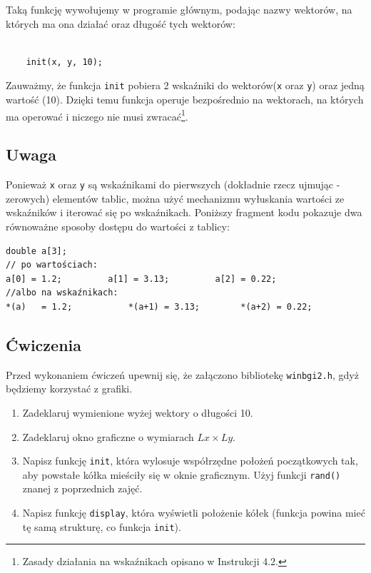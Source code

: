 \documentclass{instrukcja}
\begin{document}
Taką funkcję wywołujemy w programie głównym, podając nazwy wektorów, na których ma ona działać oraz długość tych wektorów:

\begin{verbatim}

	init(x, y, 10);

\end{verbatim}

Zauważmy, że funkcja {\tt init} pobiera 2 wskaźniki do wektorów({\tt x} oraz {\tt y}) oraz jedną wartość (10). Dzięki temu funkcja operuje bezpośrednio na wektorach, na których ma operować i niczego nie musi zwracać\footnote{Zasady działania na wskaźnikach opisano w Instrukcji 4.2.}. 

\subsection*{Uwaga}
Ponieważ {\tt x} oraz {\tt y} są wskaźnikami do pierwszych (dokładnie rzecz ujmując - zerowych) elementów tablic, można użyć mechanizmu wyłuskania wartości ze wskaźników i iterować się po wskaźnikach. Poniższy fragment kodu pokazuje dwa równoważne sposoby dostępu do wartości z tablicy:

\begin{verbatim}
double a[3];
// po wartościach:
a[0] = 1.2;         a[1] = 3.13;         a[2] = 0.22;
//albo na wskaźnikach:
*(a)   = 1.2;           *(a+1) = 3.13;        *(a+2) = 0.22;
\end{verbatim}

\subsection*{Ćwiczenia}
Przed wykonaniem ćwiczeń upewnij się, że załączono bibliotekę \verb|winbgi2.h|, gdyż będziemy korzystać z grafiki.
\begin{enumerate}
\item Zadeklaruj wymienione wyżej wektory o długości 10.
\item Zadeklaruj okno graficzne o wymiarach \(Lx \times Ly\).
\item Napisz funkcję \verb|init|, która wylosuje współrzędne położeń początkowych tak, aby powstałe kółka mieściły się w oknie graficznym. Użyj funkcji \verb|rand()| znanej z poprzednich zajęć.
\item Napisz funkcję {\tt display}, która wyświetli położenie kółek (funkcja powina mieć tę samą strukturę, co funkcja \verb|init|).
\end{enumerate}
\end{document}
